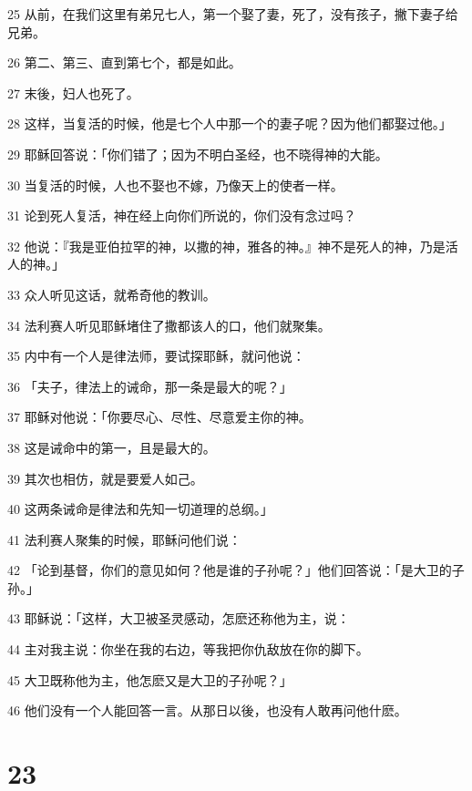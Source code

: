 \par 25 从前，在我们这里有弟兄七人，第一个娶了妻，死了，没有孩子，撇下妻子给兄弟。
\par 26 第二、第三、直到第七个，都是如此。
\par 27 末後，妇人也死了。
\par 28 这样，当复活的时候，他是七个人中那一个的妻子呢？因为他们都娶过他。」
\par 29 耶稣回答说：「你们错了；因为不明白圣经，也不晓得神的大能。
\par 30 当复活的时候，人也不娶也不嫁，乃像天上的使者一样。
\par 31 论到死人复活，神在经上向你们所说的，你们没有念过吗？
\par 32 他说：『我是亚伯拉罕的神，以撒的神，雅各的神。』神不是死人的神，乃是活人的神。」
\par 33 众人听见这话，就希奇他的教训。
\par 34 法利赛人听见耶稣堵住了撒都该人的口，他们就聚集。
\par 35 内中有一个人是律法师，要试探耶稣，就问他说：
\par 36 「夫子，律法上的诫命，那一条是最大的呢？」
\par 37 耶稣对他说：「你要尽心、尽性、尽意爱主你的神。
\par 38 这是诫命中的第一，且是最大的。
\par 39 其次也相仿，就是要爱人如己。
\par 40 这两条诫命是律法和先知一切道理的总纲。」
\par 41 法利赛人聚集的时候，耶稣问他们说：
\par 42 「论到基督，你们的意见如何？他是谁的子孙呢？」他们回答说：「是大卫的子孙。」
\par 43 耶稣说：「这样，大卫被圣灵感动，怎麽还称他为主，说：
\par 44 主对我主说：你坐在我的右边，等我把你仇敌放在你的脚下。
\par 45 大卫既称他为主，他怎麽又是大卫的子孙呢？」
\par 46 他们没有一个人能回答一言。从那日以後，也没有人敢再问他什麽。

\chapter{23}

